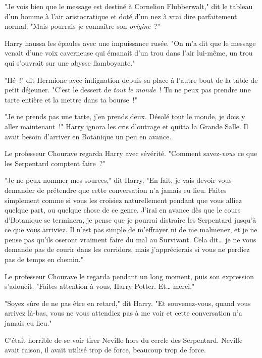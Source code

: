 \later

"Je vois bien que le message est destiné à Cornelion Flubberwalt," dit le tableau d'un homme à l'air aristocratique et doté d'un nez à vrai dire parfaitement normal. "Mais pourrais-je connaître son \emph{origine}~?"

Harry haussa les épaules avec une impuissance rusée. "On m'a dit que le message venait d'une voix caverneuse qui émanait d'un trou dans l'air lui-même, un trou qui s'ouvrait sur une abysse flamboyante."

\later

"Hé~!" dit Hermione avec indignation depuis sa place à l'autre bout de la table de petit déjeuner. "C'est le dessert de \emph{tout le monde}~! Tu ne peux pas prendre une tarte entière et la mettre dans ta bourse~!"

"Je ne prends pas une tarte, j'en prends deux. Désolé tout le monde, je dois y aller maintenant~!" Harry ignora les cris d'outrage et quitta la Grande Salle. Il avait besoin d'arriver en Botanique un peu en avance.

\later

Le professeur Chourave regarda Harry avec sévérité. "Comment savez-\emph{vous} ce que les Serpentard comptent faire~?"

"Je ne peux nommer mes sources," dit Harry. "En fait, je vais devoir vous demander de prétendre que cette conversation n'a jamais eu lieu. Faites simplement comme si vous les croisiez naturellement pendant que vous alliez quelque part, ou quelque chose de ce genre. J'irai en avance dès que le cours d'Botanique se terminera, je pense que je pourrai distraire les Serpentard jusqu'à ce que vous arriviez. Il n'est pas simple de m'effrayer ni de me malmener, et je ne pense pas qu'ils oseront vraiment faire du mal au Survivant. Cela dit… je ne vous demande pas de courir dans les corridors, mais j'apprécierais si vous ne perdiez pas de temps en chemin."

Le professeur Chourave le regarda pendant un long moment, puis son expression s'adoucit. "Faites attention à vous, Harry Potter. Et… merci."

"Soyez sûre de ne pas être en retard," dit Harry. "Et souvenez-vous, quand vous arrivez là-bas, vous ne vous attendiez pas à me voir et cette conversation n'a jamais eu lieu."

\later

C'était horrible de se voir tirer Neville hors du cercle des Serpentard. Neville avait raison, il avait utilisé trop de force, beaucoup trop de force.

